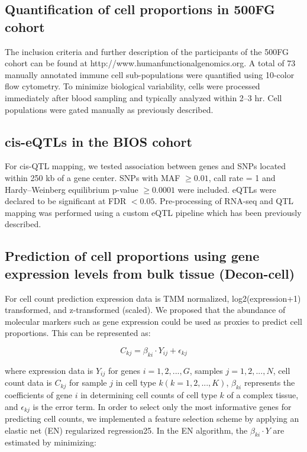 \subsection{Quantification of cell proportions in 500FG cohort}
The inclusion criteria and further description of the participants of the 500FG cohort can be found at http://www.humanfunctionalgenomics.org. A total of 73 manually annotated immune cell sub-populations were quantified using 10-color flow cytometry. To minimize biological variability, cells were processed immediately after blood sampling and typically analyzed within 2–3 hr. Cell populations were gated manually as previously described\cite{aguirre-gamboaDifferentialEffectsEnvironmental2016}.

\subsection{cis-eQTLs in the BIOS cohort}
For cis-QTL mapping, we tested association between genes and SNPs located within 250 kb of a gene center. SNPs with MAF $\geq 0.01$, call rate = 1 and Hardy–Weinberg equilibrium p-value $\geq 0.0001$ were included. eQTLs were declared to be significant at FDR $< 0.05$. Pre-processing of RNA-seq and QTL mapping was performed using a custom eQTL pipeline which has been previously described\cite{zhernakovaIdentificationContextdependentExpression2017a}.

\subsection{Prediction of cell proportions using gene expression levels from bulk tissue (Decon-cell)}
For cell count prediction expression data is TMM normalized, log2(expression+1) transformed, and z-transformed (scaled). We proposed that the abundance of molecular markers such as gene expression could be used as proxies to predict cell proportions. This can be represented as:

\begin{equation}
C_{kj} = \beta_{ki} \cdot Y_{ij} + \epsilon_{kj}
\end{equation}

where expression data is $Y_{ij}$ for genes $i = 1, 2,..., G$, samples $j = 1, 2, ..., N$, cell count data is $C_{kj}$ for sample $j$ in cell type $k (k = 1, 2, ..., K)$, $\beta_{ki}$ represents the coefficients of gene $i$ in determining cell counts of cell type $k$ of a complex tissue, and $\epsilon_{kj}$ is the error term.
In order to select only the most informative genes for predicting cell counts, we implemented a feature selection scheme by applying an elastic net (EN) regularized regression25. In the EN algorithm, the $\beta_{ki} \cdot Y$ are estimated by minimizing:


